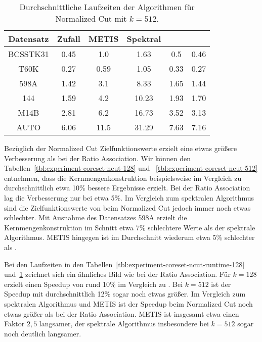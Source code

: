 \begin{table}[h]
\centering
\begin{tabular}{@{}cccccc@{}} \toprule
	\textbf{Datensatz} & \textbf{Zufall} & \textbf{METIS} & \textbf{Spektral} & \textbf{\kkmpp{}} & \textbf{\KCsTwo{}} \\ \midrule
	BCSSTK31 	& 0.45 & 1.0 & 1.63 & 0.5 & 0.46  \\
	T60K 		& 0.27 & 0.59 & 1.05 & 0.33 & 0.27  \\
	598A 		& 1.42 & 3.1 & 8.33 & 1.65 & 1.44  \\
	144 		& 1.59 & 4.2 & 10.23 & 1.93 & 1.70  \\
	M14B 		& 2.81 & 6.2 & 16.73 & 3.52 & 3.13 \\
	AUTO 		& 6.06 & 11.5 & 31.29 & 7.63 & 7.16 \\
	\bottomrule
\end{tabular}
\caption{Durchschnittliche Laufzeiten der Algorithmen für Normalized Cut mit $k = 512$.}
\label{tbl:experiment-coreset-ncut-runtime-512}
\end{table}
Bezüglich der Normalized Cut Zielfunktionswerte erzielt \KCsTwo{} eine etwas größere Verbesserung als bei der Ratio Association.
Wir können den Tabellen~\ref{tbl:experiment-coreset-ncut-128} und ~\ref{tbl:experiment-coreset-ncut-512} entnehmen, dass die
Kernmengenkonstruktion beispielsweise im Vergleich zu \kkmpp{} durchschnittlich etwa 10\% bessere Ergebnisse erzielt. Bei
der Ratio Association lag die Verbesserung nur bei etwa 5\%. Im Vergleich zum spektralen Algorithmus sind die
Zielfunktionswerte von \KCsTwo{} beim Normalized Cut jedoch immer noch etwas schlechter. Mit Ausnahme des Datensatzes 598A
erzielt die Kernmengenkonstruktion im Schnitt etwa 7\% schlechtere Werte als der spektrale Algorithmus. METIS hingegen
ist im Durchschnitt wiederum etwa 5\% schlechter als \KCsTwo.

Bei den Laufzeiten in den Tabellen~\ref{tbl:experiment-coreset-ncut-runtime-128} und~\ref{tbl:experiment-coreset-ncut-runtime-512}
zeichnet sich ein ähnliches Bild wie bei der Ratio Association. Für $k=128$ erzielt \KCsTwo{} einen Speedup von rund 10\%
im Vergleich zu \kkmpp. Bei $k=512$ ist der Speedup mit durchschnittlich 12\% sogar noch etwas größer. Im Vergleich zum
spektralen Algorithmus und METIS ist der Speedup beim Normalized Cut noch etwas größer als bei der Ratio Association.
METIS ist insgesamt etwa einen Faktor $2,5$ langsamer, der spektrale Algorithmus insbesondere bei $k=512$ sogar noch deutlich
langsamer.